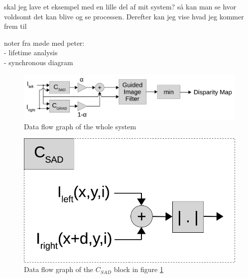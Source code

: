skal jeg lave et eksempel med en lille del af mit system? så kan man se hvor voldsomt det kan blive og se processen. Derefter kan jeg vise hvad jeg kommer frem til

noter fra møde med peter:\\
- lifetime analysis \\
- synchronous diagram
\color{black}

\newpage
\begin{figure}[ht!]
  \centering
  \includegraphics[scale=0.3]{figures/whole_system}
  \caption{Data flow graph of the whole system}
  \label{fig:whole_system}
\end{figure}

\begin{figure}[ht!]
  \centering
  \includegraphics[scale=0.3]{figures/c_sad}
  \caption{Data flow graph of the $C_{SAD}$ block in figure \ref{fig:whole_system}}
  \label{fig:c_sad}
\end{figure}

